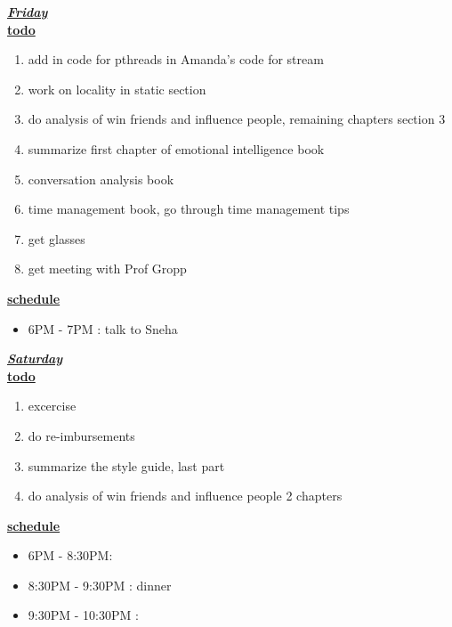 \underline{\textbf{\textit{Friday}}}\\
\underline{\textbf{todo}}\\
\begin{enumerate}
\item add in code for pthreads in Amanda's code for stream  
\item work on locality in static section 
\item do analysis of win friends and influence people, remaining chapters section 3   
\item summarize first chapter of emotional intelligence book 
\item conversation analysis book 
\item time management book, go through time management tips 
\item get glasses
\item get meeting with Prof Gropp
\end{enumerate}

\underline{\textbf{schedule}}\\
\begin{itemize}
\item 6PM - 7PM : talk to Sneha
\end{itemize}

\underline{\textbf{\textit{Saturday}}}\\
\underline{\textbf{todo}}\\
\begin{enumerate}
\item excercise
\item do re-imbursements
\item summarize the style guide, last part 
\item do analysis of win friends and influence people 2 chapters 
\end{enumerate}

\underline{\textbf{schedule}}\\
\begin{itemize}
\situationItem 12PM - 1PM:
\item 6PM - 8:30PM:
\item 8:30PM - 9:30PM : dinner
\item 9:30PM - 10:30PM :
\end{itemize}

